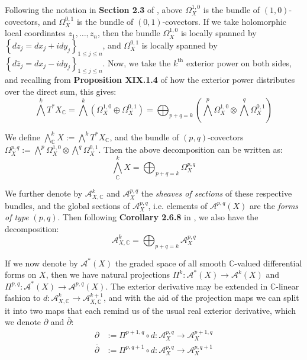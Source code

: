 \documentclass[11pt]{article}
\newcommand{\C}{\mathbb{C}}
\theoremstyle{definition}
\numberwithin{theorem}{section} %
\numberwithin{equation}{section} %
\begin{document}
\noindent Following the notation in \textbf{Section 2.3} of \cite{VoisinI2002}, above $\Omega^{1,0}_X$ is the bundle of $(1,0)$-covectors, and $\Omega^{0,1}_X$ is the bundle of $(0,1)$-covectors. If we take holomorphic local coordinates $z_1, \ldots, z_n$, then the bundle $\Omega^{1,0}_X$ is locally spanned by $\left\{dz_j = dx_j + i dy_j\right\}_{1\leq j\leq n}$, and $\Omega^{0,1}_X$ is locally spanned by $\left\{d\bar{z}_j = dx_j - i dy_j\right\}_{1\leq j\leq n}$. Now, we take the $k^\text{th}$ exterior power on both sides, and recalling from \textbf{Proposition XIX.1.4} of \cite{Lang2002} how the exterior power distributes over the direct sum, this gives:
$$
\bigwedge^kT^*X_\C = \bigwedge^k\left(\Omega^{1,0}_X \oplus \Omega^{0,1}_X\right) = \bigoplus_{p+q=k}\left( \bigwedge^p\Omega^{1,0}_X \otimes \bigwedge^q \Omega^{0,1}_X\right)
$$

\noindent We define $\bigwedge^k_\C X:=\bigwedge^k T^* X_\C$, and the bundle of $(p,q)$-covectors $\Omega^{p,q}_X:=\bigwedge^p \Omega^{1,0}_X \otimes \bigwedge^q \Omega^{0,1}_X$. Then the above decomposition can be written as:
$$
\bigwedge^k_\C X = \bigoplus_{p+q=k} \Omega_X^{p,q}
$$

\noindent We further denote by $\mathcal{A}^k_{X,\C}$ and $\mathcal{A}^{p,q}_X$ the \emph{sheaves of sections} of these respective bundles, and the global sections of $\mathcal{A}^{p,q}_X$, i.e. elements of $\mathcal{A}^{p,q}(X)$ are the \emph{forms of type} $(p,q)$. Then following \textbf{Corollary 2.6.8} in \cite{Huybrechts2005}, we also have the decomposition:
$$
\mathcal{A}^k_{X,\C} = \bigoplus_{p+q=k} \mathcal{A}^{p,q}_X
$$

\noindent If we now denote by $\mathcal{A}^*(X)$ the graded space of all smooth $\C$-valued differential forms on $X$, then we have natural projections $\Pi^{k}:\mathcal{A}^*(X)\to \mathcal{A}^k(X)$ and $\Pi^{p,q}:\mathcal{A}^*(X)\to \mathcal{A}^{p,q}(X)$. The exterior derivative may be extended in $\C$-linear fashion to $d:\mathcal{A}^k_{X,\C}\to \mathcal{A}^{k+1}_{X,\C}$, and with the aid of the projection maps we can split it into two maps that each remind us of the usual real exterior derivative, which we denote $\partial$ and $\bar \partial$:
\begin{align*}
    \partial &:= \Pi^{p+1,q}\circ d:\mathcal{A}^{p,q}_X\to \mathcal{A}^{p+1,q}_X \\
    \bar \partial &:= \Pi^{p,q+1}\circ d:\mathcal{A}^{p,q}_X\to \mathcal{A}^{p,q+1}_X
\end{align*}
\end{document}
